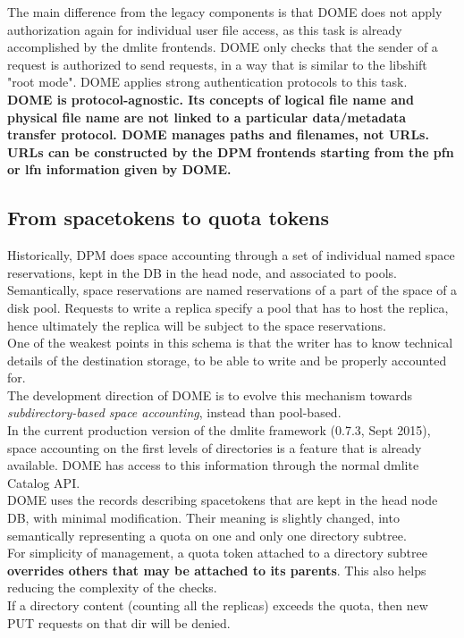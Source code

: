 \documentclass[a4paper,10pt]{scrreprt}
\begin{document}
The main difference from the legacy components is that DOME does not apply authorization again for individual user file
access, as this task is already accomplished by the dmlite frontends. DOME only checks that the sender of a request is authorized to
send requests, in a way that is similar to the libshift "root mode". DOME applies strong authentication protocols to this task.\\

\textbf{DOME is protocol-agnostic. Its concepts of logical file name and physical file name are not linked to a particular data/metadata transfer protocol.
DOME manages paths and filenames, not URLs. URLs can be constructed by the DPM frontends starting from the pfn or lfn information given by DOME.}


\subsection{From spacetokens to quota tokens}
Historically, DPM does space accounting through a set of individual named space reservations, kept in the DB in the head node, and associated to
pools. Semantically, space reservations are named reservations of a part of the space of a disk pool. Requests to write a replica specify a pool
that has to host the replica, hence ultimately the replica will be subject to the space reservations.\\
One of the weakest points in this schema is that the writer has to know technical details of the destination storage, to be able to write
and be properly accounted for.\\

The development direction of DOME is to evolve this mechanism towards \textit{subdirectory-based space accounting}, instead than pool-based.\\

In the current production version of the dmlite framework (0.7.3, Sept 2015), space accounting on the first levels of directories
is a feature that is already available. DOME has access to this information through the normal dmlite Catalog API.\\

DOME uses the records describing spacetokens that are kept in the head node DB, with minimal modification. Their meaning is slightly changed,
into semantically representing a quota on one and only one directory subtree.\\

For simplicity of management, a quota token attached to a directory subtree \textbf{overrides others that may be attached to its parents}. This also helps reducing the complexity of the checks.\\
If a directory content (counting all the replicas) exceeds the quota, then new PUT requests on that dir will be denied.\\
\end{document}
